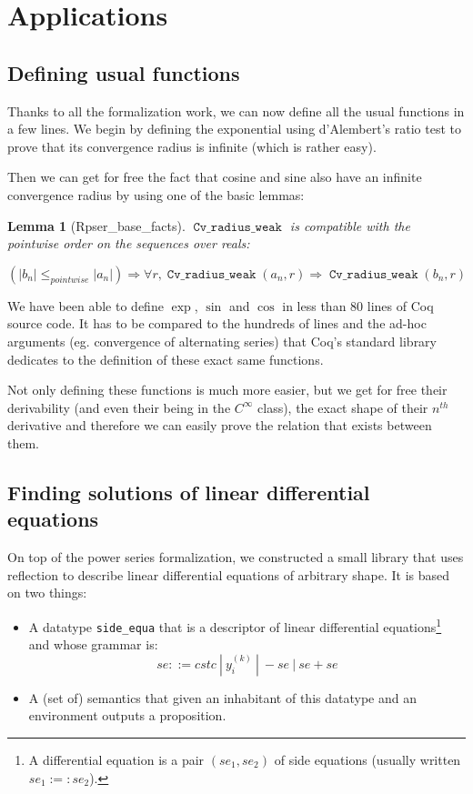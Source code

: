 \documentclass[submission,copyright]{eptcs}
\DeclareMathOperator{\cvrw}{\mathtt{Cv\_radius\_weak}}
\newtheorem{lemma}{Lemma}
\begin{document}
\section{Applications}

\subsection{Defining usual functions}

Thanks to all the formalization work, we can now define all the usual
functions in a few lines. We begin by defining the exponential using
d'Alembert's ratio test to prove that its convergence radius is infinite
(which is rather easy).

Then we can get for free the fact that cosine and sine also have an
infinite convergence radius by using one of the basic lemmas:

\begin{lemma}[Rpser\_base\_facts] $\cvrw{}$ is compatible with the
pointwise order on the sequences over reals:

$$\left(\left|b_n\right| \le_{pointwise} \left|a_n\right|\right)
  \Rightarrow \forall r, \cvrw{}(a_n,r) \Rightarrow \cvrw{}(b_n,r)$$
\end{lemma}

We have been able to define $\exp$, $\sin$ and $\cos$ in less than 80
lines of Coq source code. It has to be compared to the hundreds
of lines and the ad-hoc arguments (eg. convergence of alternating series)
that Coq's standard library dedicates to the definition of these exact
same functions.

Not only defining these functions is much more easier, but we get for
free their derivability (and even their being in the $C^{\infty}$ class),
the exact shape of their $n^{th}$ derivative and therefore we can easily
prove the relation that exists between them.

\subsection{Finding solutions of linear differential equations}

On top of the power series formalization, we constructed a small library
that uses reflection to describe linear differential equations of
arbitrary shape. It is based on two things:

\begin{itemize}
 \item A datatype \texttt{side\_equa} that is a descriptor of linear 
   differential equations\footnote{A differential equation is a pair
   $(se_1,se_2)$ of side equations (usually written $se_1 :=: se_2$).} and whose grammar is:
	$$se ::= cst c ~|~ y_{i}^{(k)} ~|~ - se ~|~ se + se$$

 \item A (set of) semantics that given an inhabitant of this datatype
	and an environment outputs a proposition.
\end{itemize}
\end{document}
